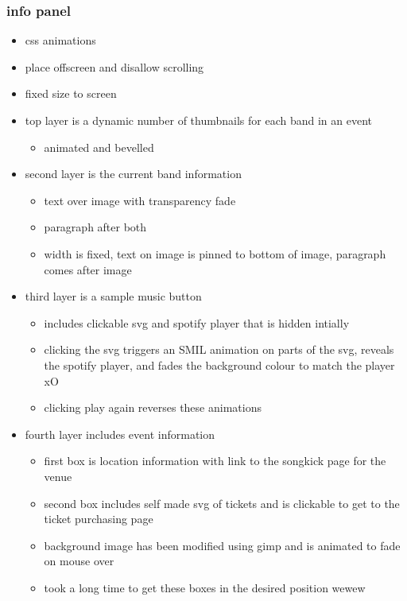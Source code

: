 \documentclass[10pt]{article}
\begin{document}
            \subsubsection{info panel}
                \begin{itemize}
                    \item css animations
                    \item place offscreen and disallow scrolling
                    \item fixed size to screen

                    \item top layer is a dynamic number of thumbnails for each band in an event
                        \begin{itemize}
                            \item animated and bevelled
                        \end{itemize}
                    \item second layer is the current band information
                        \begin{itemize}
                            \item text over image with transparency fade
                            \item paragraph after both
                            \item width is fixed, text on image is pinned to bottom of image, paragraph comes after image
                        \end{itemize}
                    \item third layer is a sample music button
                        \begin{itemize}
                            \item includes clickable svg and spotify player that is hidden intially
                            \item clicking the svg triggers an SMIL animation on parts of the svg, reveals the spotify player, and fades the background colour to match the player xO
                            \item clicking play again reverses these animations
                        \end{itemize}

                    \item fourth layer includes event information
                        \begin{itemize}
                            \item first box is location information with link to the songkick page for the venue
                            \item second box includes self made svg of tickets and is clickable to get to the ticket purchasing page
                            \item background image has been modified using gimp and is animated to fade on mouse over
                            \item took a long time to get these boxes in the desired position wewew
                        \end{itemize}
                \end{itemize}
\end{document}
